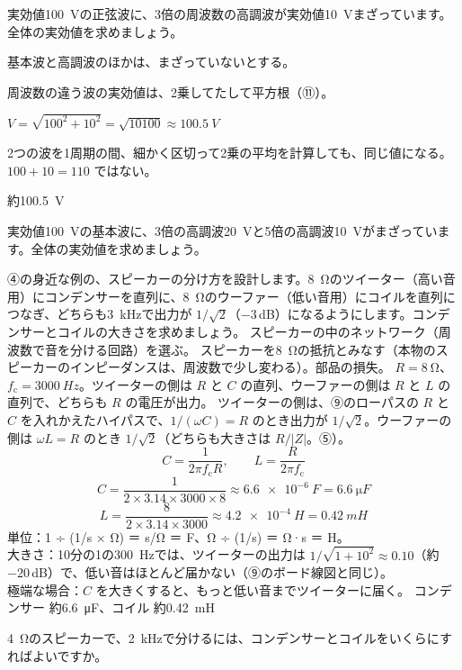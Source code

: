 \begin{reidai}[高調波がまざった電圧の実効値]
\label{ph:電-10:ex12}実効値\qty{100}{V}の正弦波に、3倍の周波数の高調波が実効値\qty{10}{V}まざっています。全体の実効値を求めましょう。
\par{} 基本波と高調波のほかは、まざっていないとする。
\par\kangaekata 周波数の違う波の実効値は、2乗してたして平方根（⑪）。
\par\shiki $V=\sqrt{100^2+10^2}=\sqrt{10100}\approx\qty{100.5}{V}$
\par{} 2つの波を1周期の間、細かく区切って2乗の平均を計算しても、同じ値になる。$100+10=110$ ではない。
\par\kotae 約\qty{100.5}{V}
\end{reidai}
\begin{jibun}
実効値\qty{100}{V}の基本波に、3倍の高調波\qty{20}{V}と5倍の高調波\qty{10}{V}がまざっています。全体の実効値を求めましょう。
\end{jibun}

\begin{phreidai}
\label{ph:電-10:ex13}④の身近な例の、スピーカーの分け方を設計します。\qty{8}{\ohm}のツイーター（高い音用）にコンデンサーを直列に、\qty{8}{\ohm}のウーファー（低い音用）にコイルを直列につなぎ、どちらも\qty{3}{kHz}で出力が $1/\sqrt2$（$-3$\,dB）になるようにします。コンデンサーとコイルの大きさを求めましょう。
\phbamen
スピーカーの中のネットワーク（周波数で音を分ける回路）を選ぶ。
\phmushi
スピーカーを\qty{8}{\ohm}の抵抗とみなす（本物のスピーカーのインピーダンスは、周波数で少し変わる）。部品の損失。
\phzu
$R=\qty{8}{\ohm}$、$f_{\mathrm c}=\qty{3000}{Hz}$。ツイーターの側は $R$ と $C$ の直列、ウーファーの側は $R$ と $L$ の直列で、どちらも $R$ の電圧が出力。
\phriyu
ツイーターの側は、⑨のローパスの $R$ と $C$ を入れかえたハイパスで、$1/(\omega C)=R$ のとき出力が $1/\sqrt2$。ウーファーの側は $\omega L=R$ のとき $1/\sqrt2$（どちらも大きさは $R/\lvert Z\rvert$。⑤）。
\phtateru
\[ C=\frac{1}{2\pi f_{\mathrm c}R},\qquad L=\frac{R}{2\pi f_{\mathrm c}} \]
\phtoku
\[ C=\frac{1}{2\times3.14\times3000\times8}\approx\qty{6.6e-6}{F}=\qty{6.6}{\micro F} \]
\[ L=\frac{8}{2\times3.14\times3000}\approx\qty{4.2e-4}{H}=\qty{0.42}{mH} \]
\phtashikame
単位：1 ÷ (1/s × Ω) ＝ s/Ω ＝ F、Ω ÷ (1/s) ＝ Ω·s ＝ H。\\
大きさ：10分の1の\qty{300}{Hz}では、ツイーターの出力は $1/\sqrt{1+10^2}\approx0.10$（約 $-20$\,dB）で、低い音はほとんど届かない（⑨のボード線図と同じ）。\\
極端な場合：$C$ を大きくすると、もっと低い音までツイーターに届く。
\kotae コンデンサー 約\qty{6.6}{\micro F}、コイル 約\qty{0.42}{mH}
\end{phreidai}
\begin{jibun}
\qty{4}{\ohm}のスピーカーで、\qty{2}{kHz}で分けるには、コンデンサーとコイルをいくらにすればよいですか。
\end{jibun}

